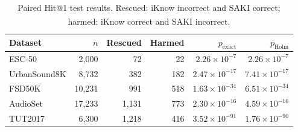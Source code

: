 \section{}\label{app:mcnemar-tests}
\setcounter{table}{0}
\renewcommand{\thetable}{E.\arabic{table}}


\begin{table}[H]
\centering
\color{blue}
\caption{Paired Hit@1 test results. Rescued: iKnow\textsuperscript{\dag} incorrect and SAKI correct; harmed: iKnow\textsuperscript{\dag} correct and SAKI incorrect.}
\label{tab:mcnemar-tests}
\fontsize{9}{11}\selectfont
\setlength{\tabcolsep}{4pt}
\begin{tabular}{lrrrrr}
\toprule
Dataset & $n$ & Rescued & Harmed & $p_{\mathrm{exact}}$ & $p_{\mathrm{Holm}}$ \\
\midrule
ESC-50 & 2,000 & 72 & 22 & $2.26\times10^{-7}$ & $2.26\times10^{-7}$ \\
UrbanSound8K & 8,732 & 382 & 182 & $2.47\times10^{-17}$ & $7.41\times10^{-17}$ \\
FSD50K & 10,231 & 991 & 518 & $1.63\times10^{-34}$ & $6.51\times10^{-34}$ \\
AudioSet & 17,233 & 1,131 & 773 & $2.30\times10^{-16}$ & $4.59\times10^{-16}$ \\
TUT2017 & 6,300 & 1,218 & 416 & $3.52\times10^{-91}$ & $1.76\times10^{-90}$ \\
\bottomrule
\end{tabular}
\end{table}
